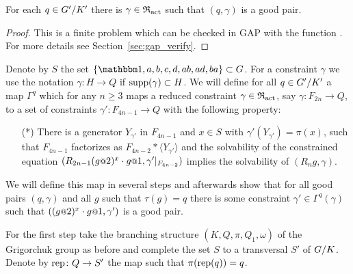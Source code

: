 \documentclass[a4paper,11pt]{amsart}
\begin{document}
\begin{lem} \label{lem:existsGoodGamma}
 For each $q\in{G'/K'}$ there is $\gamma\in \mathfrak{R}_{\operatorname{act}}$ such that $(q,\gamma)$ is a 
 good pair.
\end{lem}
\begin{proof}
 This is a finite problem which can be checked in GAP with the function .
 For more details see Section~\ref{sec:gap_verify}.
\end{proof}

Denote by $S$ the set $\{\id,a,b,c,d,ab,ad,ba\}\subset G$.  For a
constraint $\gamma$ we use the notation $\gamma\colon H \to Q$ if
$\operatorname{{supp}}(\gamma) \subset H$.  We will define for all $q\in {G'/K'}$
a map $\Gamma^q$ which for any $n \ge 3$ maps a reduced constraint
$\gamma\in\mathfrak{R}_{\operatorname{act}}$, say $\gamma\colon F_{2n} \to Q$, to a set of
constraints $\gamma'\colon F_{4n-1}\to Q$ with the following property:
\begin{itemize}
\item[(*)] There is a generator $Y_{\gamma'}$ in $F_{4n-1}$ and
  $x\in S$ with $\gamma'(Y_{\gamma'})=\pi(x)$, such that $F_{4n-1}$
  factorizes as $F_{4n-2} * \langle Y_{\gamma'} \rangle$ and the
  solvability of the constrained equation
  $(R_{2n-1} (g\at{2})^x \cdot g\at{1},\gamma'|_{F_{4n-2}})$ implies
  the solvability of $(R_ng,\gamma)$.
\end{itemize}

We will define this map in several steps and afterwards show that for
all good pairs $(q,\gamma)$ and all $g$ such that $\tau(g)=q$ there is
some constraint $\gamma' \in \Gamma^q(\gamma)$ such that
$((g\at{2})^x \cdot g\at{1},\gamma')$ is a good pair.
 
For the first step take the branching structure $(K,Q,\pi,Q_1,\omega)$
of the Grigorchuk group as before and complete the set $S$ to a
transversal $S'$ of ${G/K}$. Denote by $\operatorname{rep}\colon Q\to S'$ the
map such that $\pi(\operatorname{rep}(q)) = q$.
 
\end{document}
